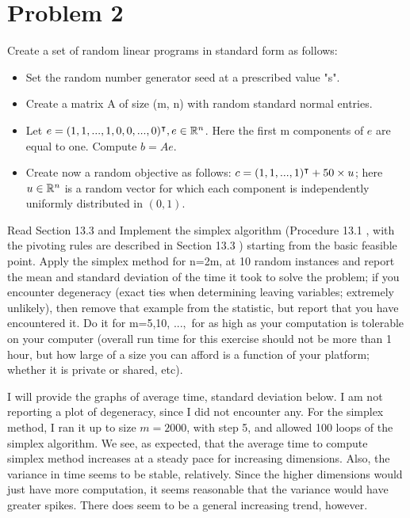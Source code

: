 \section{Problem 2}
Create a set of random linear programs in standard form as follows:
\begin{itemize}
    \item Set the random number generator seed at a prescribed value "s".
    \item Create a matrix A of size (m, n) with random standard normal entries.
    \item Let $e = (1, 1, ..., 1, 0, 0, ..., 0)^{\intercal} , e \in \mathbb{R}^n$. Here the first m components of $e$ are equal to one. Compute $b = Ae$.
    \item Create now a random objective as follows: $c = (1, 1, ..., 1)^{\intercal} + 50 \times u$; here $u\in \mathbb{R}^n$ is a random vector for which each component is independently uniformly distributed in $(0, 1)$.
\end{itemize}
Read Section 13.3 and Implement the simplex algorithm (Procedure 13.1 , with the pivoting rules are described in Section 13.3 ) starting from the basic feasible point. Apply the simplex method for n=2m, at 10 random instances and report the mean and standard deviation of the time it took to solve the problem; if you encounter degeneracy (exact ties when determining leaving variables; extremely unlikely), then remove that example from the statistic, but report that you have encountered it. Do it for m=5,10, $..., $ for as high as your computation is tolerable on your computer (overall run time for this exercise should not be more than 1 hour, but how large of a size you can afford is a function of your platform; whether it is private or shared, etc).
\partbreak
\begin{solution}

    I will provide the graphs of average time, standard deviation below. I am not reporting a plot of degeneracy, since I did not encounter any. For the simplex method, I ran it up to size $m = 2000$, with step 5, and allowed 100 loops of the simplex algorithm. We see, as expected, that the average time to compute simplex method increases at a steady pace for increasing dimensions. Also, the variance in time seems to be stable, relatively. Since the higher dimensions would just have more computation, it seems reasonable that the variance would have greater spikes. There does seem to be a general increasing trend, however. 
\end{solution}

